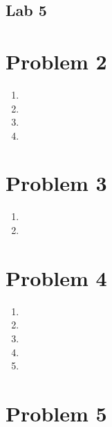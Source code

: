 \documentclass[11pt, oneside]{article}   	%
\begin{document}
\begin{center}
\section*{Lab 5}
\end{center}

\begin{flushleft}



\newpage
\section*{Problem 2}
\begin{enumerate}
    \item %
    \item %
    \item %
    \item %
\end{enumerate}
\newpage
\section*{Problem 3}
\begin{enumerate}
    \item %
    \item %
\end{enumerate}
\newpage
\section*{Problem 4}
\begin{enumerate}
    \item %
    \item %
    \item %
    \item %
    \item %
\end{enumerate}
\newpage
\section*{Problem 5}

\end{flushleft}
\end{document}
